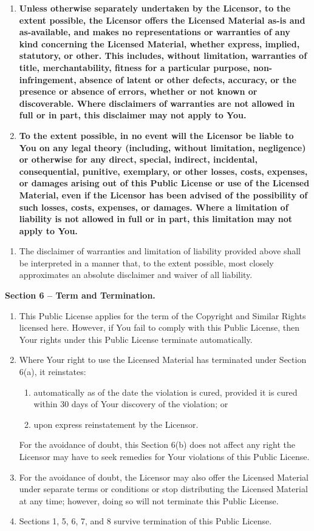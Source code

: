 \begin{enumerate}
\item \textbf{Unless otherwise separately undertaken by the Licensor, to the extent possible, the Licensor offers the Licensed Material as-is and as-available, and makes no representations or warranties of any kind concerning the Licensed Material, whether express, implied, statutory, or other. This includes, without limitation, warranties of title, merchantability, fitness for a particular purpose, non-infringement, absence of latent or other defects, accuracy, or the presence or absence of errors, whether or not known or discoverable. Where disclaimers of warranties are not allowed in full or in part, this disclaimer may not apply to You.}
\item \textbf{To the extent possible, in no event will the Licensor be liable to You on any legal theory (including, without limitation, negligence) or otherwise for any direct, special, indirect, incidental, consequential, punitive, exemplary, or other losses, costs, expenses, or damages arising out of this Public License or use of the Licensed Material, even if the Licensor has been advised of the possibility of such losses, costs, expenses, or damages. Where a limitation of liability is not allowed in full or in part, this limitation may not apply to You.}
\end{enumerate}
\begin{enumerate}
\item The disclaimer of warranties and limitation of liability provided above shall be interpreted in a manner that, to the extent possible, most closely approximates an absolute disclaimer and waiver of all liability.
\end{enumerate}
\par \textbf{Section 6 – Term and Termination.}
\begin{enumerate}
\item This Public License applies for the term of the Copyright and Similar Rights licensed here. However, if You fail to comply with this Public License, then Your rights under this Public License terminate automatically.
\item 
\par Where Your right to use the Licensed Material has terminated under Section 6(a), it reinstates:
\begin{enumerate}
\item automatically as of the date the violation is cured, provided it is cured within 30 days of Your discovery of the violation; or
\item upon express reinstatement by the Licensor.
\end{enumerate}
For the avoidance of doubt, this Section 6(b) does not affect any right the Licensor may have to seek remedies for Your violations of this Public License.
\item For the avoidance of doubt, the Licensor may also offer the Licensed Material under separate terms or conditions or stop distributing the Licensed Material at any time; however, doing so will not terminate this Public License.
\item Sections 1, 5, 6, 7, and 8 survive termination of this Public License.
\end{enumerate}
